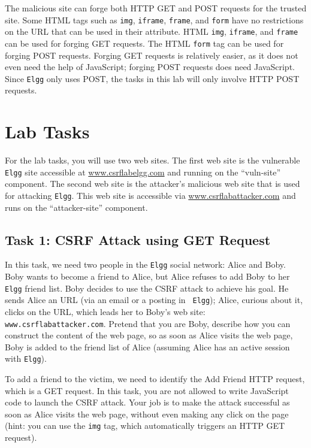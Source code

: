 The malicious site can forge both HTTP GET and POST requests for the
trusted site. Some HTML tags such as \texttt{img}, \texttt{iframe},
\texttt{frame}, and \texttt{form} have no restrictions on the URL that can
be used in their attribute. HTML \texttt{img}, \texttt{iframe}, and
\texttt{frame} can be used for forging GET requests. The HTML
\texttt{form} tag can be used for forging POST requests. 
Forging GET requests is relatively easier, as it does not even need 
the help of JavaScript; forging POST requests does need JavaScript. 
Since {\tt Elgg} only uses POST, the tasks in this lab will 
only involve HTTP POST requests.

\section{Lab Tasks}

For the lab tasks, you will use two web sites.
The first web site is the vulnerable \texttt{Elgg}
site accessible at \url{www.csrflabelgg.com} and running on the ``vuln-site''
component. The second
web site is the attacker's malicious web site that is used for
attacking {\tt Elgg}. This web site is accessible via
\url{www.csrflabattacker.com} and runs on the ``attacker-site'' component.


\subsection{Task 1: CSRF Attack using GET Request}

In this task, we need two people in the {\tt Elgg} social network: Alice
and Boby. Boby wants to become a friend to Alice, but Alice refuses to add 
Boby to her {\tt Elgg} friend list. Boby decides to use the CSRF attack to
achieve his goal. He sends Alice an URL (via an email or a posting in {\tt
Elgg}); Alice, curious about it, clicks on the URL, which leads her to Boby's web site:    
{\tt www.csrflabattacker.com}. Pretend that you are Boby, describe how you
can construct the content of the web page, so as soon as Alice visits the
web page, Boby is added to the friend list of Alice (assuming Alice has an
active session with {\tt Elgg}).


To add a friend to the victim, we need to identify the Add Friend
HTTP request, which is a GET request. In this task, you are not allowed to
write JavaScript code to launch the CSRF attack. Your job is to make the
attack successful as soon as Alice visits the web page, without even making
any click on the page (hint: you can use the {\tt img} tag, which
automatically triggers an HTTP GET request).
 

